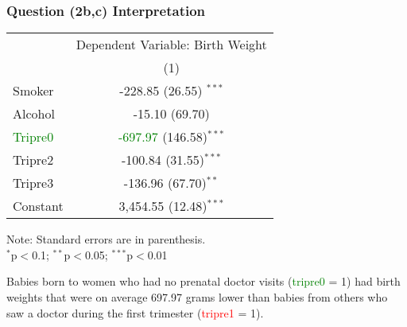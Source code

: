 \documentclass[11pt, xcolor=x11names,compress]{beamer}
\begin{document}
\begin{frame}[fragile,t]
\frametitle{Question (2b,c) Interpretation} 
\begin{center}
\begin{threeparttable}
\begin{tabular}{lc} 
\hline 
 & \multicolumn{1}{c}{Dependent Variable: Birth Weight} \\ 
\cline{2-2} 
 & (1) \\ 
\hline 
 Smoker & -228.85 (26.55) $^{***}$ \\ 
  Alcohol & -15.10 (69.70)\\ 
  \textcolor{green}{Tripre0} & \textcolor{green}{-697.97} (146.58)$^{***}$ \\ 
  Tripre2 & -100.84 (31.55)$^{***}$ \\ 
  Tripre3 & -136.96 (67.70)$^{**}$ \\ 
  Constant & 3,454.55 (12.48)$^{***}$ \\ 
\hline 
\end{tabular} 
\begin{tablenotes}[flushleft]
\footnotesize
Note: Standard errors are in parenthesis. \\
$^{*}$p$<$0.1; $^{**}$p$<$0.05; $^{***}$p$<$0.01 \\ 
\end{tablenotes}
\end{threeparttable}
\end{center}
Babies born to women who had no prenatal doctor visits (\textcolor{green}{tripre0} = 1) had birth weights that were on average 697.97 grams lower than babies from others
who saw a doctor during the first trimester (\textcolor{red}{tripre1} = 1).
\end{frame}
\end{document}
